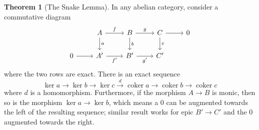 \documentclass[10pt]{report}
\theoremstyle{definition}
\newtheorem{theorem}{Theorem}
\begin{document}
\begin{theorem}[The Snake Lemma]
In any abelian category, consider a commutative diagram
$$
\begin{tikzcd}
            & A \arrow[r, "f"] \arrow[d, "a"] & B \arrow[r, "g"] \arrow[d, "b"] & C \arrow[r] \arrow[d, "c"] & 0 \\
0 \arrow[r] & A' \arrow[r, "f'"']             & B' \arrow[r, "g'"']             & C'                         &
\end{tikzcd}
$$
where the two rows are exact. There is an exact sequence
$$\ker a\to\ker b\to\ker c\overset{d}{\to}\operatorname{coker}a\to\operatorname{coker}b\to\operatorname{coker}c$$
where $d$ is a homomorphism.
Furthermore, if the morphism $A\to B$ is monic, then so is the morphism $\ker a\to\ker b$, which means a $0$ can be augmented towards the left of the resulting sequence; similar result works for epic $B'\to C'$ and the $0$ augmented towards the right.
\end{theorem}
\end{document}
